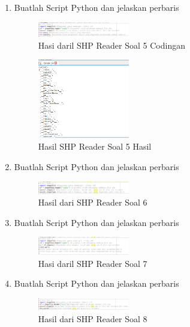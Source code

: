 \begin{enumerate}
    \item Buatlah Script Python dan jelaskan perbaris
    
    \hfill\break
    \begin{figure}[H]
		\includegraphics[width=4cm]{figures/1174051/3/5.png}
		\centering
		\caption{Hasi daril SHP Reader Soal 5 Codingan}
    \end{figure}

    \hfill\break
    \begin{figure}[H]
		\includegraphics[width=4cm]{figures/1174051/3/5hasil.png}
		\centering
		\caption{Hasil SHP Reader Soal 5 Hasil}
    \end{figure}
    
    \item Buatlah Script Python dan jelaskan perbaris
    
    \hfill\break
    \begin{figure}[H]
		\includegraphics[width=4cm]{figures/1174051/3/6.png}
		\centering
		\caption{Hasil dari SHP Reader Soal 6}
    \end{figure}

    \item Buatlah Script Python dan jelaskan perbaris
    
    \hfill\break
    \begin{figure}[H]
		\includegraphics[width=4cm]{figures/1174051/3/7.png}
		\centering
		\caption{Hasi daril SHP Reader Soal 7}
    \end{figure}

    \item Buatlah Script Python dan jelaskan perbaris
    
    \hfill\break
    \begin{figure}[H]
		\includegraphics[width=4cm]{figures/1174051/3/8.png}
		\centering
		\caption{Hasil dari SHP Reader Soal 8}
    \end{figure}


\end{enumerate}
